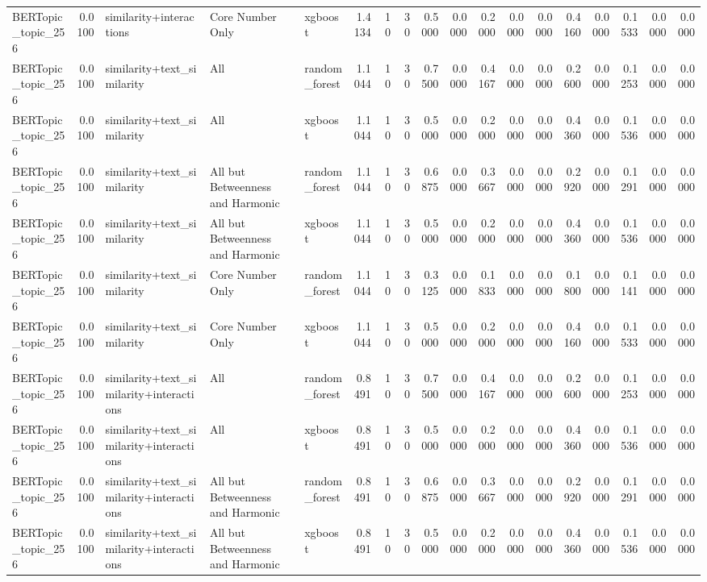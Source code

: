 \begin{tabular}{lrlllrrrrrrrrrrrrr}
BERTopic_topic_256 & 0.0100 & similarity+interactions & Core Number Only & xgboost & 1.4134 & 10 & 30 & 0.5000 & 0.0000 & 0.2000 & 0.0000 & 0.0000 & 0.4160 & 0.0000 & 0.1533 & 0.0000 & 0.0000 \\
BERTopic_topic_256 & 0.0100 & similarity+text_similarity & All & random_forest & 1.1044 & 10 & 30 & 0.7500 & 0.0000 & 0.4167 & 0.0000 & 0.0000 & 0.2600 & 0.0000 & 0.1253 & 0.0000 & 0.0000 \\
BERTopic_topic_256 & 0.0100 & similarity+text_similarity & All & xgboost & 1.1044 & 10 & 30 & 0.5000 & 0.0000 & 0.2000 & 0.0000 & 0.0000 & 0.4360 & 0.0000 & 0.1536 & 0.0000 & 0.0000 \\
BERTopic_topic_256 & 0.0100 & similarity+text_similarity & All but Betweenness and Harmonic & random_forest & 1.1044 & 10 & 30 & 0.6875 & 0.0000 & 0.3667 & 0.0000 & 0.0000 & 0.2920 & 0.0000 & 0.1291 & 0.0000 & 0.0000 \\
BERTopic_topic_256 & 0.0100 & similarity+text_similarity & All but Betweenness and Harmonic & xgboost & 1.1044 & 10 & 30 & 0.5000 & 0.0000 & 0.2000 & 0.0000 & 0.0000 & 0.4360 & 0.0000 & 0.1536 & 0.0000 & 0.0000 \\
BERTopic_topic_256 & 0.0100 & similarity+text_similarity & Core Number Only & random_forest & 1.1044 & 10 & 30 & 0.3125 & 0.0000 & 0.1833 & 0.0000 & 0.0000 & 0.1800 & 0.0000 & 0.1141 & 0.0000 & 0.0000 \\
BERTopic_topic_256 & 0.0100 & similarity+text_similarity & Core Number Only & xgboost & 1.1044 & 10 & 30 & 0.5000 & 0.0000 & 0.2000 & 0.0000 & 0.0000 & 0.4160 & 0.0000 & 0.1533 & 0.0000 & 0.0000 \\
BERTopic_topic_256 & 0.0100 & similarity+text_similarity+interactions & All & random_forest & 0.8491 & 10 & 30 & 0.7500 & 0.0000 & 0.4167 & 0.0000 & 0.0000 & 0.2600 & 0.0000 & 0.1253 & 0.0000 & 0.0000 \\
BERTopic_topic_256 & 0.0100 & similarity+text_similarity+interactions & All & xgboost & 0.8491 & 10 & 30 & 0.5000 & 0.0000 & 0.2000 & 0.0000 & 0.0000 & 0.4360 & 0.0000 & 0.1536 & 0.0000 & 0.0000 \\
BERTopic_topic_256 & 0.0100 & similarity+text_similarity+interactions & All but Betweenness and Harmonic & random_forest & 0.8491 & 10 & 30 & 0.6875 & 0.0000 & 0.3667 & 0.0000 & 0.0000 & 0.2920 & 0.0000 & 0.1291 & 0.0000 & 0.0000 \\
BERTopic_topic_256 & 0.0100 & similarity+text_similarity+interactions & All but Betweenness and Harmonic & xgboost & 0.8491 & 10 & 30 & 0.5000 & 0.0000 & 0.2000 & 0.0000 & 0.0000 & 0.4360 & 0.0000 & 0.1536 & 0.0000 & 0.0000 \\

\end{tabular}

